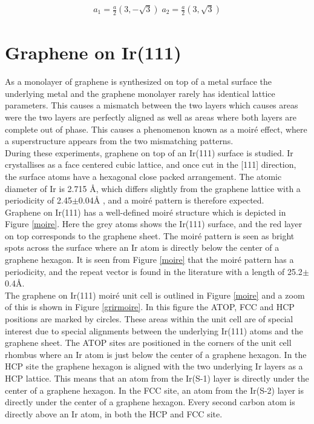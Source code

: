 \begin{align*}
  a_1 = \frac{a}{2}(3,-\sqrt{3}) \; a_2 = \frac{a}{2}(3,\sqrt{3})
\end{align*}



\section{Graphene on Ir(111)}

As a monolayer of graphene is synthesized on top of a metal surface the underlying metal and the graphene monolayer rarely has identical lattice parameters. This causes a mismatch between the two layers which causes areas were the two layers are perfectly aligned as well as areas where both layers are complete out of phase. This causes a phenomenon known as a moiré effect, where a superstructure appears from the two mismatching patterns.\\
During these experiments, graphene on top of an Ir(111) surface is studied. Ir crystallises as a face centered cubic lattice, and once cut in the [111] direction, the surface atoms have a hexagonal close packed arrangement.\cite{kibler2003preparation} The atomic diameter of Ir is 2.715 Å\cite{kibler2003preparation}, which differs slightly from the graphene lattice with a periodicity of 2.45$\pm$0.04Å \cite{1367-2630-10-4-043033}, and a moiré pattern is therefore expected.\\
Graphene on Ir(111) has a well-defined moiré structure which is depicted in Figure \ref{moire}. Here the grey atoms shows the Ir(111) surface, and the red layer on top corresponds to the graphene sheet. The moiré pattern is seen as bright spots across the surface where an Ir atom is directly below the center of a graphene hexagon. It is seen from Figure \ref{moire} that the moiré pattern has a periodicity, and the repeat vector is found in the literature with a length of 25.2$\pm$0.4Å.\\
The graphene on Ir(111) moiré unit cell is outlined in Figure \ref{moire} and a zoom of this is shown in Figure \ref{grirmoire}. In this figure the ATOP, FCC and HCP positions are marked by circles. These areas within the unit cell are of special interest due to special alignments between the underlying Ir(111) atoms and the graphene sheet. The ATOP sites are positioned in the corners of the unit cell rhombus where an Ir atom is just below the center of a graphene hexagon. In the HCP site the graphene hexagon is aligned with the two underlying Ir layers as a HCP lattice. This means that an atom from the Ir(S-1) layer is directly under the center of a graphene hexagon. In the FCC site, an atom from the Ir(S-2) layer is directly under the center of a graphene hexagon. Every second carbon atom is directly above an Ir atom, in both the HCP and FCC site.

